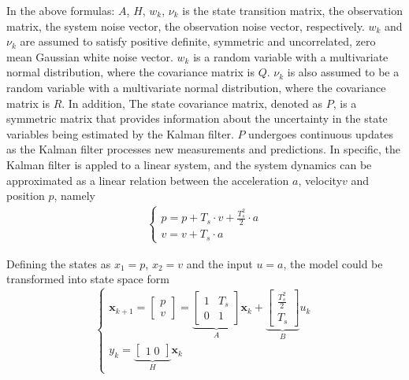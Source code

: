 In the above formulas: $A$, $H$, $w_{k}$, $\nu_{k}$ is the state transition matrix, the observation matrix, the system noise vector, the observation noise vector, respectively. $w_{k}$ and $\nu_{k}$ are assumed to satisfy positive definite, symmetric and uncorrelated, zero mean Gaussian white noise vector. $w_{k}$ is a random variable with a multivariate normal distribution, where the covariance matrix is $Q$. $\nu_{k}$ is also assumed to be a random variable with a multivariate normal distribution, where the covariance matrix is $R$. In addition, The state covariance matrix, denoted as $P$, is a symmetric matrix that provides information about the uncertainty in the state variables being estimated by the Kalman filter. $P$ undergoes continuous updates as the Kalman filter processes new measurements and predictions. In specific, the Kalman filter is appled to a linear system, and the system dynamics can be approximated as a linear relation between the acceleration $a$, velocity$v$ and position $p$, namely 
\begin{align*}
    \begin{cases} 
    p = p + T_s\cdot v + \frac{T_s^2}{2}\cdot a\\
    v = v + T_s\cdot a
    \end{cases}
    \label{eq:kf_dynamics}
\end{align*}

Defining the states as $x_1 = p$, $x_2 = v$ and the input $u = a$, the model could be transformed into state space form
\begin{equation}
    \begin{cases} 
    \mathbf{x}_{k+1} = \begin{bmatrix}p \\v \end{bmatrix} = \underbrace{\begin{bmatrix}1 & T_s \\0 & 1\end{bmatrix}}_{A} \mathbf{x}_k + \underbrace{\begin{bmatrix}\frac{T_s^2}{2}  \\T_s \end{bmatrix}}_{B} u_k \\
    y_k = \underbrace{\begin{bmatrix}1\;0\end{bmatrix}}_{H} \mathbf{x}_k
    \end{cases}
    \label{eq:kf_state}
\end{equation}

